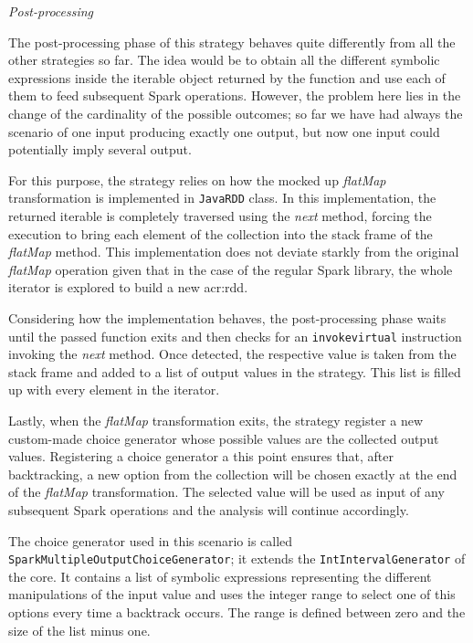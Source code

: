\textit{Post-processing}

The post-processing phase of this strategy behaves quite differently from all the other strategies so far. The idea would be to obtain all the different symbolic expressions inside the iterable object returned by the function and use each of them to feed subsequent Spark operations. However, the problem here lies in the change of the cardinality of the possible outcomes; so far we have had always the scenario of one input producing exactly one output, but now one input could potentially imply several output.

For this purpose, the strategy relies on how the mocked up \textit{flatMap} transformation is implemented in \texttt{JavaRDD} class. In this implementation, the returned iterable is completely traversed using the \textit{next} method, forcing the execution to bring each element of the collection into the stack frame of the \textit{flatMap} method. This implementation does not deviate starkly from the original \textit{flatMap} operation given that in the case of the regular Spark library, the whole iterator is explored to build a new \acrshort{acr:rdd}.

Considering how the implementation behaves, the post-processing phase waits until the passed function exits and then checks for an \texttt{invokevirtual} instruction invoking the \textit{next} method. Once detected, the respective value is taken from the stack frame and added to a list of output values in the strategy. This list is filled up with every element in the iterator.

Lastly, when the \textit{flatMap} transformation exits, the strategy register a new custom-made choice generator whose possible values are the collected output values. Registering a choice generator a this point ensures that, after backtracking, a new option from the collection will be chosen exactly at the end of the \textit{flatMap} transformation. The selected value will be used as input of any subsequent Spark operations and the analysis will continue accordingly.

The choice generator used in this scenario is called \texttt{SparkMultipleOutputChoiceGenerator}; it extends the \texttt{IntIntervalGenerator} of the \jpf{}
core. It contains a list of symbolic expressions representing the different manipulations of the input value and uses the integer range to select one of this options every time a backtrack occurs. The range is defined between zero and the size of the list minus one.